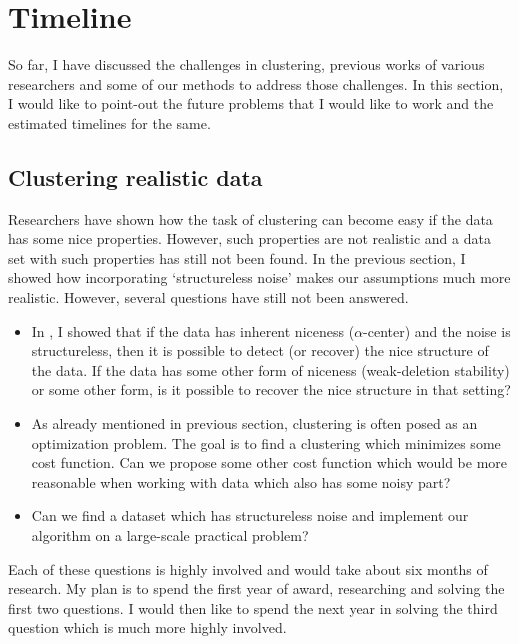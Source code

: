 \documentclass[11pt]{article}
\begin{document}
\section{Timeline}
\label{section:timeline}
So far, I have discussed the challenges in clustering, previous works of various researchers and some of our methods to address those challenges. In this section, I would like to point-out the future problems that I would like to work and the estimated timelines for the same.

\subsection{Clustering realistic data}
Researchers have shown how the task of clustering can become easy if the data has some nice properties. However, such properties are not realistic and a data set with such properties has still not been found. In the previous section, I showed how incorporating `structureless noise' makes our assumptions much more realistic. However, several questions have still not been answered.

\begin{itemize}
\item In \cite{kushagra2016finding},  I showed that if the data has inherent niceness ($\alpha$-center) and the noise is structureless, then it is possible to detect (or recover) the nice structure of the data. If the data has some other form of niceness (weak-deletion stability) or some other form, is it possible to recover the nice structure in that setting?
\item As already mentioned in previous section, clustering is often posed as an optimization problem. The goal is to find a clustering which minimizes some cost function. Can we propose some other cost function which would be more reasonable when working with data which also has some noisy part?
\item Can we find a dataset which has structureless noise and implement our algorithm on a large-scale practical problem?
\end{itemize}
Each of these questions is highly involved and would take about six months of research. My plan is to spend the first year of award, researching and solving the first two questions. I would then like to spend the next year in solving the third question which is much more highly involved.
\end{document}

